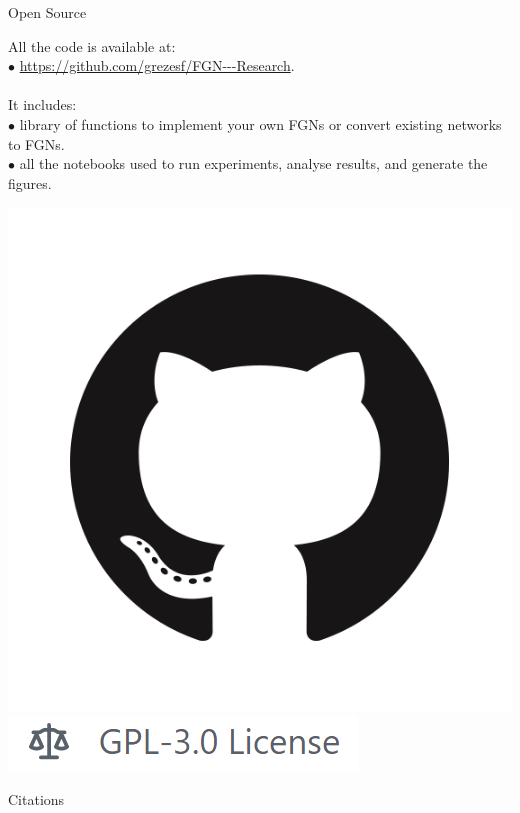 \documentclass{beamer}
\begin{document}
\begin{frame}{Open Source}
    
    \begin{block}{}
    All the code is available at:\\
    \quad $\bullet$ \url{https://github.com/grezesf/FGN---Research}.\\
    ~\\
    It includes:\\
    \quad $\bullet$ library of functions to implement your own FGNs or convert existing networks to FGNs.\\
    \quad $\bullet$ all the notebooks used to run experiments, analyse results, and generate the figures.

    \end{block}
    \centering
    \includegraphics[width=.08\textheight]{images/misc/GitHub-Mark.png} 
    \includegraphics[width=.4\textheight]{images/misc/gpl3.PNG}

\end{frame}


\begin{frame}[allowframebreaks]{Citations}
    \printbibliography

\end{frame}
\end{document}
